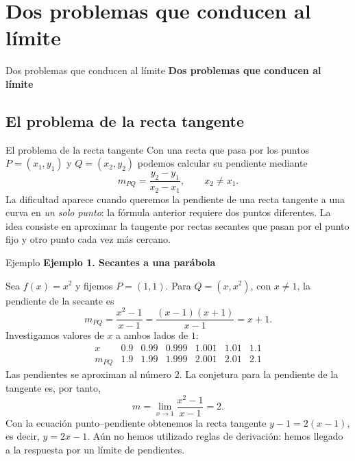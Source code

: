 \documentclass[12pt,aspectratio=169]{beamer}
\begin{document}
\section{Dos problemas que conducen al límite}

\begin{frame}[t]{Dos problemas que conducen al límite}
\centering\vfill{\Large\bfseries\color{azul} Dos problemas que conducen al límite}\vfill
\end{frame}


\subsection{El problema de la recta tangente}

\begin{frame}[t,allowframebreaks]{El problema de la recta tangente}
Con una recta que pasa por los puntos $P=(x_1,y_1)$ y $Q=(x_2,y_2)$ podemos calcular su pendiente mediante
\[
 m_{PQ}=\frac{y_2-y_1}{x_2-x_1},\qquad x_2\ne x_1.
\]
La dificultad aparece cuando queremos la pendiente de una recta tangente a una curva en \emph{un solo punto}: la fórmula anterior requiere dos puntos diferentes. La idea consiste en aproximar la tangente por rectas secantes que pasan por el punto fijo y otro punto cada vez más cercano.
\end{frame}


\begin{frame}[t,allowframebreaks]{Ejemplo}
{\color{azul}\bfseries Ejemplo 1. Secantes a una parábola}\par\medskip

Sea $f(x)=x^2$ y fijemos $P=(1,1)$. Para $Q=(x,x^2)$, con $x\ne1$, la pendiente de la secante es
\[
 m_{PQ}=\frac{x^2-1}{x-1}=\frac{(x-1)(x+1)}{x-1}=x+1.
\]
Investigamos valores de $x$ a ambos lados de $1$:
\[
\begin{array}{c|rrrrrr}
 x&0.9&0.99&0.999&1.001&1.01&1.1\\\hline
 m_{PQ}&1.9&1.99&1.999&2.001&2.01&2.1
\end{array}
\]
Las pendientes se aproximan al número $2$. La conjetura para la pendiente de la tangente es, por tanto,
\[
 m=\lim_{x\to1}\frac{x^2-1}{x-1}=2.
\]
Con la ecuación punto--pendiente obtenemos la recta tangente $y-1=2(x-1)$, es decir, $\boxed{y=2x-1}$. Aún no hemos utilizado reglas de derivación: hemos llegado a la respuesta por un límite de pendientes.
\end{frame}
\end{document}
